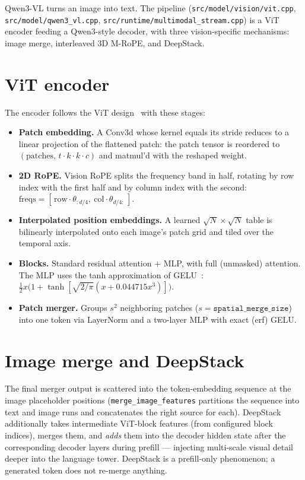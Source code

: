 \documentclass[11pt,a4paper]{report}
\newcommand{\code}[1]{\texttt{#1}}
\begin{document}
Qwen3-VL turns an image into text. The pipeline (\code{src/model/vision/vit.cpp},
\code{src/model/qwen3\_vl.cpp}, \code{src/runtime/multimodal\_stream.cpp}) is a ViT
encoder feeding a Qwen3-style decoder, with three vision-specific mechanisms: image
merge, interleaved 3D M-RoPE, and DeepStack.

\section{ViT encoder}
The encoder follows the ViT design~\citep{dosovitskiy2021vit} with these stages:
\begin{itemize}[nosep]
  \item \textbf{Patch embedding.} A Conv3d whose kernel equals its stride reduces to
        a linear projection of the flattened patch: the patch tensor is reordered to
        $(\text{patches},\, t\cdot k\cdot k\cdot c)$ and matmul'd with the reshaped
        weight.
  \item \textbf{2D RoPE.} Vision RoPE splits the frequency band in half, rotating by
        row index with the first half and by column index with the second:
        $\text{freqs} = [\,\text{row}\cdot\theta_{:d/4},\ \text{col}\cdot\theta_{d/4:}\,]$.
  \item \textbf{Interpolated position embeddings.} A learned
        $\sqrt{N}\times\sqrt{N}$ table is bilinearly interpolated onto each image's
        patch grid and tiled over the temporal axis.
  \item \textbf{Blocks.} Standard residual attention + MLP, with full (unmasked)
        attention. The MLP uses the tanh approximation of GELU~\citep{hendrycks2016gelu}:
        $\tfrac12 x\big(1+\tanh[\sqrt{2/\pi}(x+0.044715x^3)]\big)$.
  \item \textbf{Patch merger.} Groups $s^2$ neighboring patches
        ($s=\texttt{spatial\_merge\_size}$) into one token via LayerNorm and a
        two-layer MLP with exact (erf) GELU.
\end{itemize}

\section{Image merge and DeepStack}
The final merger output is scattered into the token-embedding sequence at the image
placeholder positions (\code{merge\_image\_features} partitions the sequence into
text and image runs and concatenates the right source for each). DeepStack
additionally takes intermediate ViT-block features (from configured block indices),
merges them, and \emph{adds} them into the decoder hidden state after the
corresponding decoder layers during prefill --- injecting multi-scale visual detail
deeper into the language tower. DeepStack is a prefill-only phenomenon; a generated
token does not re-merge anything.
\end{document}
